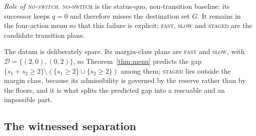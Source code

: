\documentclass[preprint,11pt,authoryear]{elsarticle}
\theoremstyle{definition}
\theoremstyle{remark}
\newcommand{\act}[1]{\textsc{#1}}
\begin{document}
\noindent\textit{Role of \act{no-switch}.} \act{no-switch} is the status-quo, non-transition baseline: its successor keeps $q=0$ and therefore misses the destination set $G$. It remains in the four-action menu so that this failure is explicit; \act{fast}, \act{slow} and \act{staged} are the candidate transition plans.

The datum is deliberately spare. Its margin-class plans are \act{fast} and \act{slow}, with $\mathcal D=\{(2,0),(0,2)\}$, so Theorem~\ref{thm:menu} predicts the gap $\{s_1+s_2\ge2\}\setminus(\{s_1\ge2\}\cup\{s_2\ge2\})$ among them; \act{staged} lies outside the margin class, because its admissibility is governed by the reserve rather than by the floors, and it is what splits the predicted gap into a rescuable and an impossible part.

\subsection{The witnessed separation}
\end{document}
